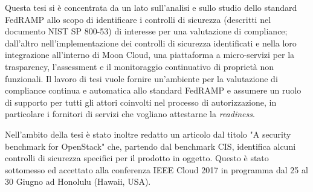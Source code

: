 \documentclass[10pt,a4paper]{article}
\begin{document}
Questa tesi si è concentrata da un lato sull'analisi e sullo studio dello standard FedRAMP allo scopo di identificare i controlli di sicurezza (descritti nel documento NIST SP 800-53) di interesse per una valutazione di compliance; dall'altro nell'implementazione dei controlli di sicurezza identificati e nella loro integrazione all'interno di Moon Cloud, una piattaforma a micro-servizi per la trasparency, l'assessment e il monitoraggio continuativo di proprietà non funzionali. Il lavoro di tesi vuole fornire un'ambiente per la valutazione di compliance continua e automatica allo standard FedRAMP e assumere un ruolo di supporto per tutti gli attori coinvolti nel processo di autorizzazione, in particolare i fornitori di servizi che vogliano attestarne la \textit{readiness}.

Nell'ambito della tesi è stato inoltre redatto un articolo dal titolo "A security benchmark for OpenStack" che, partendo dal benchmark CIS, identifica alcuni controlli di sicurezza specifici per il prodotto in oggetto.
Questo è stato sottomesso ed accettato alla conferenza IEEE Cloud 2017 in programma dal 25 al 30 Giugno  ad Honolulu (Hawaii, USA).
\end{document}
